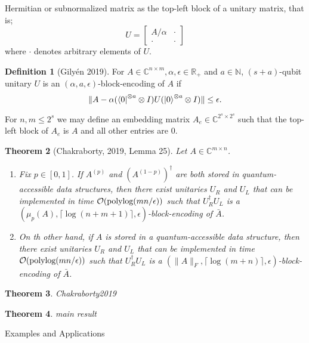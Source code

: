 \documentclass[10pt,twoside,reqno]{amsart} %
\makeatletter
\renewcommand{\section}{\@startsection{section}{1}
   \z@{.7\linespacing\@plus\linespacing}{.5\linespacing}
   {\normalfont\upshape\bfseries\centering}}
\theoremstyle{plain}
\newtheorem{thm}{Theorem}[section]
\theoremstyle{definition}
\newtheorem{defn}[thm]{Definition}
\makeatother
\begin{document}
Hermitian or subnormalized matrix as the top-left block of a unitary matrix, 
that is;
\[
  U=\begin{bmatrix}A/\alpha &\cdot \\ \cdot &\cdot \end{bmatrix}
\]
where $\cdot$ denotes arbitrary elements of $U$. 
\begin{defn}[Gily\'en 2019] For $A\in\mathbb{C}^{n\times m}, \alpha,\epsilon
  \in\mathbb{R}_{+}$ and $a\in\mathbb{N}$, $(s+a)$-qubit unitary $U$ is an
  $(\alpha,a,\epsilon)$-block-encoding of $A$ if
  \[
    \|A-\alpha(\bra0^{\otimes a}\otimes I)U(\ket0^{\otimes a}\otimes I)\|\leq
    \epsilon.
  \]
\end{defn}
For $n,m\leq 2^s$ we may define an embedding matrix $A_e\in
\mathbb{C}^{2^s\times 2^s}$ such that the top-left block of $A_e$ is $A$ and
all other entries are $0$.

\begin{thm}[Chakraborty, 2019, Lemma 25]
  Let $A\in\mathbb{C}^{m\times n}$.
  \begin{enumerate}
    \item Fix $p\in [0,1]$. If $A^{(p)}$ and $(A^{(1-p)})^{\dagger}$ are both
      stored in quantum-accessible data structures, then there exist
      unitaries $U_R$ and $U_L$ that can be implemented in time
      $\mathcal{O}(\textrm{\normalfont polylog}(mn/\epsilon))$ such that
      $U_R^{\dagger}U_L$ is a $(\mu_p(A), \lceil\log(n+m+1)\rceil, 
      \epsilon)$-block-encoding of $\bar{A}$.
    \item On th other hand, if $A$ is stored in a quantum-accessible data
      structure, then there exist unitaries $U_R$ and $U_L$ that can
      be implemented in time $\mathcal{O}(\textrm{\normalfont polylog}(mn/\epsilon))$ such
      that $U_R^{\dagger}U_L$ is a $(\|A\|_F, \lceil\log(m+n)\rceil,
      \epsilon)$-block-encoding of $\bar{A}$.
  \end{enumerate}
\end{thm}

\begin{thm}
  Chakraborty2019 
\end{thm}

\begin{thm}
  main result 
\end{thm}

\section{Examples and Applications}
\end{document}
